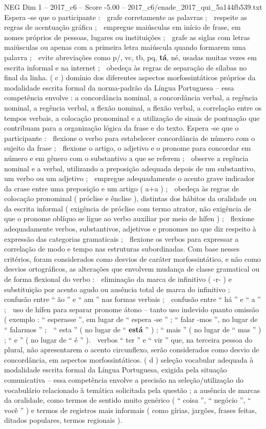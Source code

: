\begin{textsample}{NEG Dim 1 – 2017\_c6 – Score -5.00 – 2017\_c6/enade\_2017\_qui\_5a144fb539.txt}
Espera -se que o participante :  grafe corretamente as palavras ;  respeite as regras de acentuação gráfica ;  empregue maiúsculas em início de frase, em nomes próprios de pessoas, lugares ou instituições ;  grafe as siglas com letras maiúsculas ou apenas com a primeira letra maiúscula quando formarem uma palavra ;  evite abreviações como p/, vc, tb, pq, \textbf{tá}, né, usadas muitas vezes em escrita informal e na internet ;  obedeça às regras de separação de sílabas no final da linha. ( c ) domínio dos diferentes aspectos morfossintáticos próprios da modalidade escrita formal da norma-padrão da Língua Portuguesa – essa competência envolve : a concordância nominal, a concordância verbal, a regência nominal, a regência verbal, a flexão nominal, a flexão verbal, a correlação entre os tempos verbais, a colocação pronominal e a utilização de sinais de pontuação que contribuam para a organização lógica da frase e do texto.
Espera -se que o participante :  flexione o verbo para estabelecer concordância de número com o sujeito da frase ;  flexione o artigo, o adjetivo e o pronome para concordar em número e em gênero com o substantivo a que se referem ;  observe a regência nominal e a verbal, utilizando a preposição adequada depois de um substantivo, um verbo ou um adjetivo ;  empregue adequadamente o acento grave indicador da crase entre uma preposição e um artigo ( a+a ) ;  obedeça às regras de colocação pronominal ( próclise e ênclise ), distintas dos hábitos da oralidade ou da escrita informal ( exigência de próclise com termo atrator, não exigência de que o pronome oblíquo se ligue ao verbo auxiliar por meio de hífen ) ;  flexione adequadamente verbos, substantivos, adjetivos e pronomes no que diz respeito à expressão das categorias gramaticais ;  flexione os verbos para expressar a correlação de modo e tempo nas estruturas subordinadas.
Com base nesses critérios, foram considerados como desvios de caráter morfossintático, e não como desvios ortográficos, as alterações que envolvem mudança de classe gramatical ou de forma flexional do verbo :  eliminação da marca de infinitivo ( -r- ) e substituição por acento agudo ou ausência total de marca do infinitivo ;  confusão entre “ ão ” e “ am ” nas formas verbais ;  confusão entre “ há ” e “ a ” ;  uso de hífen para separar pronome átono – tanto uso indevido quanto omissão ( exemplo : “ esperasse ”, em lugar de “ espera -se ” ; “ falar -mos ”, no lugar de “ falarmos ” ;  “ esta ” ( no lugar de “ \textbf{está} ” ) ; “ mais ” ( no lugar de “ mas ” ) ; “ e ” ( no lugar de “ é ” ).  verbos “ ter ” e “ vir ” que, na terceira pessoa do plural, não apresentarem o acento circunflexo, serão considerados como desvio de concordância, em aspectos morfossintáticos. ( d ) seleção vocabular adequada à modalidade escrita formal da Língua Portuguesa, exigida pela situação comunicativa – essa competência envolve a precisão na seleção/utilização do vocabulário relacionado à temática solicitada pela questão ; a ausência de marcas da oralidade, como termos de sentido muito genérico ( “ coisa ”, “ negócio ”, “ você ” ) e termos de registros mais informais ( como gírias, jargões, frases feitas, ditados populares, termos regionais ).

\end{textsample}
